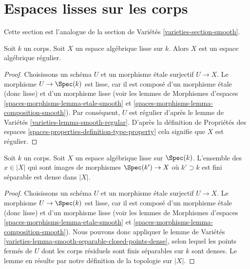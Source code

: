 \section{Espaces lisses sur les corps}
\label{section-smooth}

\noindent
Cette section est l'analogue de la
section de Variétés \ref{varieties-section-smooth}.

\begin{lemma}
\label{lemma-smooth-regular}
Soit $k$ un corps.
Soit $X$ un espace algébrique lisse sur $k$.
Alors $X$ est un espace algébrique régulier.
\end{lemma}

\begin{proof}
Choisissons un schéma $U$ et un morphisme \'etale surjectif $U \to X$.
Le morphisme $U \to \Spec(k)$ est lisse, car il est composé
d'un morphisme \'etale (donc lisse) et d'un morphisme lisse (voir les
lemmes de Morphismes d'espaces \ref{spaces-morphisms-lemma-etale-smooth}
et \ref{spaces-morphisms-lemma-composition-smooth}).
Par conséquent, $U$ est régulier d'après le
lemme de Variétés \ref{varieties-lemma-smooth-regular}.
D'après la
définition de Propriétés des espaces
\ref{spaces-properties-definition-type-property}
cela signifie que $X$ est régulier.
\end{proof}

\begin{lemma}
\label{lemma-smooth-separable-closed-points-dense}
Soit $k$ un corps. Soit $X$ un espace algébrique lisse sur $\Spec(k)$.
L'ensemble des $x \in |X|$ qui sont images de morphismes $\Spec(k') \to X$
où $k' \supset k$ est fini séparable est dense dans $|X|$.
\end{lemma}

\begin{proof}
Choisissons un schéma $U$ et un morphisme \'etale surjectif $U \to X$.
Le morphisme $U \to \Spec(k)$ est lisse, car il est composé
d'un morphisme \'etale (donc lisse) et d'un morphisme lisse (voir les
lemmes de Morphismes d'espaces \ref{spaces-morphisms-lemma-etale-smooth}
et \ref{spaces-morphisms-lemma-composition-smooth}).
Nous pouvons donc appliquer le lemme de Variétés
\ref{varieties-lemma-smooth-separable-closed-points-dense}, selon lequel
les points fermés de $U$ dont les corps résiduels sont finis séparables sur
$k$ sont denses. Le lemme en résulte par notre définition de la
topologie sur $|X|$.
\end{proof}







